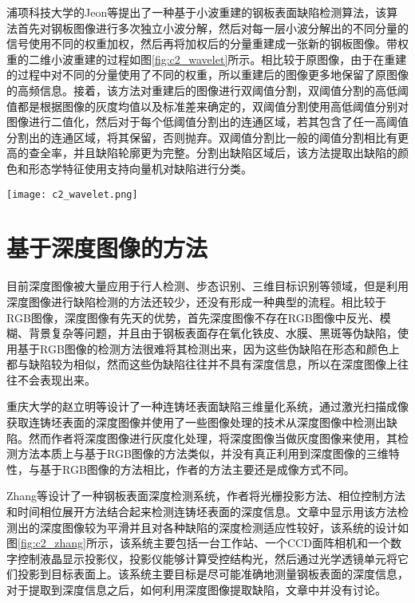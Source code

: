     浦项科技大学的Jeon等\cite{Jeon2014Defect}提出了一种基于小波重建的钢板表面缺陷检测算法，该算法首先对钢板图像进行多次独立小波分解，然后对每一层小波分解出的不同分量的信号使用不同的权重加权，然后再将加权后的分量重建成一张新的钢板图像。带权重的二维小波重建的过程如图\ref{fig:c2_wavelet}所示。相比较于原图像，由于在重建的过程中对不同的分量使用了不同的权重，所以重建后的图像更多地保留了原图像的高频信息。接着，该方法对重建后的图像进行双阈值分割，双阈值分割的高低阈值都是根据图像的灰度均值以及标准差来确定的，双阈值分割使用高低阈值分别对图像进行二值化，然后对于每个低阈值分割出的连通区域，若其包含了任一高阈值分割出的连通区域，将其保留，否则抛弃。双阈值分割比一般的阈值分割相比有更高的查全率，并且缺陷轮廓更为完整。分割出缺陷区域后，该方法提取出缺陷的颜色和形态学特征使用支持向量机对缺陷进行分类。

    \begin{figure*}[!h]
    \centering
    \texttt{[image: c2\_wavelet.png]}
    \caption{二维加权小波重建示意图}
    \label{fig:c2_wavelet}
    \end{figure*}

    \section{基于深度图像的方法}
    目前深度图像被大量应用于行人检测、步态识别、三维目标识别等领域，但是利用深度图像进行缺陷检测的方法还较少，还没有形成一种典型的流程。相比较于RGB图像，深度图像有先天的优势，首先深度图像不存在RGB图像中反光、模糊、背景复杂等问题，并且由于钢板表面存在氧化铁皮、水膜、黑斑等伪缺陷，使用基于RGB图像的检测方法很难将其检测出来，因为这些伪缺陷在形态和颜色上都与缺陷较为相似，然而这些伪缺陷往往并不具有深度信息，所以在深度图像上往往不会表现出来。

    重庆大学的赵立明等\cite{赵立明2010连铸热坯表面缺陷激光扫描成像三维量化检测方法}设计了一种连铸坯表面缺陷三维量化系统，通过激光扫描成像获取连铸坯表面的深度图像并使用了一些图像处理的技术从深度图像中检测出缺陷。然而作者将深度图像进行灰度化处理，将深度图像当做灰度图像来使用，其检测方法本质上与基于RGB图像的方法类似，并没有真正利用到深度图像的三维特性，与基于RGB图像的方法相比，作者的方法主要还是成像方式不同。

    Zhang等\cite{Zhang2014Continuous}设计了一种钢板表面深度检测系统，作者将光栅投影方法、相位控制方法和时间相位展开方法结合起来检测连铸坯表面的深度信息。文章中显示用该方法检测出的深度图像较为平滑并且对各种缺陷的深度检测适应性较好，该系统的设计如图\ref{fig:c2_zhang}所示，该系统主要包括一台工作站、一个CCD面阵相机和一个数字控制液晶显示投影仪，投影仪能够计算受控结构光，然后通过光学透镜单元将它们投影到目标表面上。该系统主要目标是尽可能准确地测量钢板表面的深度信息，对于提取到深度信息之后，如何利用深度图像提取缺陷，文章中并没有讨论。


